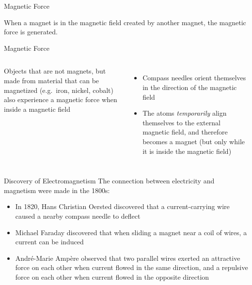 \documentclass[12pt,aspectratio=169]{beamer}
\begin{document}
\begin{frame}{Magnetic Force}
\begin{itemize}
\begin{center}
    \end{center}
  \end{itemize}
  When a magnet is in the magnetic field created by another magnet, the
  magnetic force is generated.
\end{frame}



\begin{frame}{Magnetic Force}
  \begin{columns}

    Objects that are not magnets, but made from material that can be magnetized
    (e.g.\ iron, nickel, cobalt) also experience a magnetic force when inside a
    magnetic field
    \begin{itemize}
    \item Compass needles orient themselves in the direction of the magnetic
      field
    \item The atoms \emph{temporarily} align themselves to the external
      magnetic field, and therefore becomes a magnet (but only while it is
      inside the magnetic field)
    \end{itemize}
  \end{columns}
\end{frame}



\begin{frame}{Discovery of Electromagnetism}
  The connection between electricity and magnetism were made in the 1800s:
  \begin{itemize}
  \item In 1820, Hans Christian Oersted discovered that a current-carrying
    wire caused a nearby compass needle to deflect
  \item Michael Faraday discovered that when sliding a magnet near a coil of
    wires, a current can be induced
  \item Andr\'{e}-Marie Amp\`{e}re observed that two parallel wires exerted an
    attractive force on each other when current flowed in the same direction,
    and a repulsive force on each other when current flowed in the opposite
    direction
  \end{itemize}
\end{frame}
\end{document}

